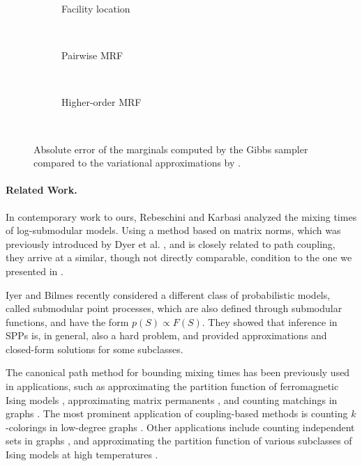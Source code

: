 \setlength{}
\setlength{}
\renewcommand{\subflen}{\textwidth}
\begin{figure}[tb]
  \begin{subfigure}[b]{\subflen}
    \centering
    
    \caption{Facility location}
    \label{fig:gibbs_exp1}
  \end{subfigure}\\[0.5em]
  \begin{subfigure}[b]{\subflen}
    \centering
    
    \caption{Pairwise MRF}
    \label{fig:gibbs_exp2}
  \end{subfigure}\\[0.5em]
  \begin{subfigure}[b]{\subflen}
    \centering
    
    \caption{Higher-order MRF}
    \label{fig:gibbs_exp3}
  \end{subfigure}\\
  \caption{Absolute error of the marginals computed by the Gibbs sampler compared to the variational approximations by \cite{djolonga14}.}
  \label{fig:gibbs_exp}
\end{figure}

\paragraph{Related Work.}
In contemporary work to ours, Rebeschini and Karbasi \cite{rebeschini15} analyzed the mixing times of log-submodular models.
Using a method based on matrix norms, which was previously introduced by Dyer et al. \cite{dyer09}, and is closely related to path coupling, they arrive at a similar, though not directly comparable, condition to the one we presented in .

Iyer and Bilmes \cite{iyer15} recently considered a different class of probabilistic models, called submodular point processes, which are also defined through submodular functions, and have the form $p(S) \propto F(S)$.
They showed that inference in SPPs is, in general, also a hard problem, and provided approximations and closed-form solutions for some subclasses.

The canonical path method for bounding mixing times has been previously used in applications, such as approximating the partition function of ferromagnetic Ising models \cite{jerrum93}, approximating matrix permanents \cite{jerrum89,jerrum04perm}, and counting matchings in graphs \cite{jerrum03}.
The most prominent application of coupling-based methods is counting $k$-colorings in low-degree graphs \cite{jerrum95,bubley98,jerrum03}.
Other applications include counting independent sets in graphs \cite{dyer00}, and approximating the partition function of various subclasses of Ising models at high temperatures \cite{levin08}.

